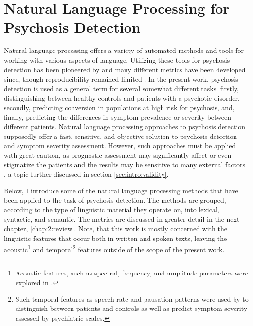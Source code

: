 \section{Natural Language Processing for Psychosis Detection}
\label{sec:intro:NLP}

Natural language processing offers a variety of automated methods and tools for working with various aspects of language. Utilizing these tools for psychosis detection has been pioneered by \citet{elvevaag2007quantifying} and many different metrics have been developed since, though reproducibility remained limited \citep{hitczenko2021understanding, parola2022speech, fradkin2023theory}. In the present work, psychosis detection is used as a general term for several somewhat different tasks: firstly, distinguishing between healthy controls and patients with a psychotic disorder, secondly, predicting conversion in populations at high risk for psychosis, and, finally, predicting the differences in symptom prevalence or severity between different patients. Natural language processing approaches to psychosis detection supposedly offer a fast, sensitive, and objective solution to psychosis detection and symptom severity assessment. However, such approaches must be applied with great caution, as prognostic assessment may significantly affect or even stigmatize the patients and the results may be sensitive to many external factors \citep{just2023validation}, a topic further discussed in section \ref{sec:intro:validity}.

Below, I introduce some of the natural language processing methods that have been applied to the task of psychosis detection. The methods are grouped, according to the type of linguistic material they operate on, into lexical, syntactic, and semantic. The metrics are discussed in greater detail in the next chapter, \ref{chap:2:review}. Note, that this work is mostly concerned with the linguistic features that occur both in written and spoken texts, leaving the acoustic\footnote{Acoustic features, such as spectral, frequency, and amplitude parameters were explored in \citet{voppel2023semantic, tang2023latent, de2023acoustic, wouts2021belabbert}.} and temporal\footnote{Such temporal features as speech rate and pausation patterns were used by \citet{aich2022towards, liebenthal2022linguistic, de2023acoustic, tang2023latent} to distinguish between patients and controls as well as predict symptom severity assessed by psychiatric scales.} features outside of the scope of the present work. 


